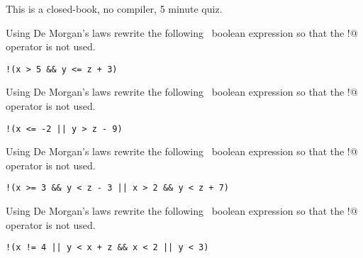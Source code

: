 

This is a closed-book, no compiler, 5 minute quiz.

\nextq
Using De Morgan's laws rewrite the following \cpp\ boolean expression so that
the \verb@!@ operator is not used.
\begin{center}
\verb~!(x > 5 && y <= z + 3)~
\end{center}
\ANSWER
\begin{answercode}

\end{answercode}

\nextq
Using De Morgan's laws rewrite the following \cpp\ boolean expression so that
the \verb@!@ operator is not used.
\begin{center}
\verb~!(x <= -2 || y > z - 9)~
\end{center}
\ANSWER
\begin{answercode}

\end{answercode}

\nextq
Using De Morgan's laws rewrite the following \cpp\ boolean expression so that the
\verb@!@ operator is not used.
\begin{center}
\verb~!(x >= 3 && y < z - 3 || x > 2 && y < z + 7)~
\end{center}
\ANSWER
\begin{answercode}

\end{answercode}

\nextq
Using De Morgan's laws rewrite the following \cpp\ boolean expression so that the
\verb@!@ operator is not used.
\begin{center}
\verb~!(x != 4 || y < x + z && x < 2 || y < 3)~
\end{center}
\ANSWER
\begin{answercode}

\end{answercode}


